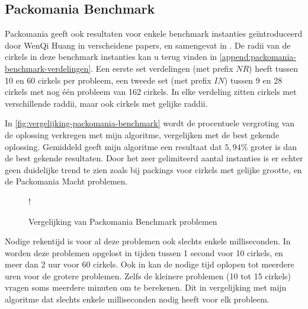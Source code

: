 \documentclass[12pt,a4paper,oneside]{book}
\begin{document}
\subsection{Packomania Benchmark}

Packomania geeft ook resultaten voor enkele benchmark instanties geïntroduceerd door WenQi Huang in verscheidene papers, en samengevat in \cite{huang2006new}.
De radii van de cirkels in deze benchmark instanties kan u terug vinden in \autoref{append:packomania-benchmark-verdelingen}.
Een eerste set verdelingen (met prefix $NR$) heeft tussen 10 en 60 cirkels per probleem, een tweede set (met prefix $IN$) tussen 9 en 28 cirkels met nog één probleem van 162 cirkels.
In elke verdeling zitten cirkels met verschillende raddii, maar ook cirkels met gelijke raddii.

In \autoref{fig:vergelijking-packomania-benchmark} wordt de procentuele vergroting van de oplossing verkregen met mijn algoritme, vergelijken met de best gekende oplossing.
Gemiddeld geeft mijn algoritme een resultaat dat $5,94\%$ groter is dan de best gekende resultaten.
Door het zeer gelimiteerd aantal instanties is er echter geen duidelijke trend te zien zoals bij packings voor cirkels met gelijke grootte, en de Packomania Macht problemen.

\begin {figure}
	\centering
	 {!} {
	}
	\caption{Vergelijking van Packomania Benchmark problemen}
	\label{fig:vergelijking-packomania-benchmark}
\end {figure}

Nodige rekentijd is voor al deze problemen ook slechts enkele milliseconden.
In \cite{ye2013iterated} worden deze problemen opgelost in tijden tussen 1 second voor 10 cirkels, en meer dan 2 uur voor 60 cirkels.
Ook in \cite{huang2013tabu} kan de nodige tijd oplopen tot meerdere uren voor de grotere problemen.
Zelfs de kleinere problemen (10 tot 15 cirkels) vragen soms meerdere minuten om te berekenen.
Dit in vergelijking met mijn algoritme dat slechts enkele milliseconden nodig heeft voor elk probleem.
\end{document}
